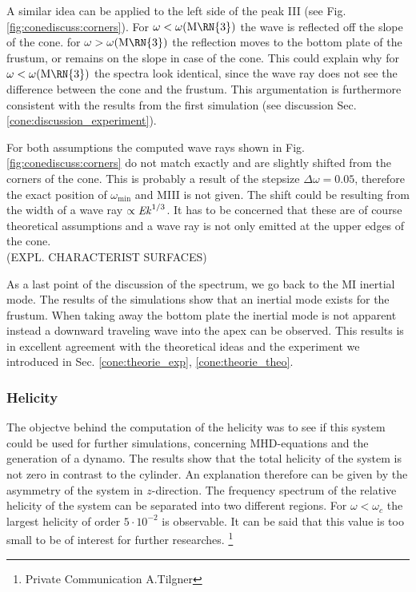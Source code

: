 A similar idea can be applied to the left side of the peak \RN{3} (see Fig. \ref{fig:conediscuss:corners}).
For $\omega<\omega(\text{M\RN{3}})$ the wave is reflected off the slope of the cone.
for  $\omega>\omega(\text{M\RN{3}})$ the reflection moves to the bottom plate of the frustum,
or remains on the slope in case of the cone.
This could explain why for   $\omega<\omega(\text{M\RN{3}})$  the spectra look identical,
since the wave ray does not see the difference between the cone and the frustum.
This argumentation is furthermore consistent with the results from the first simulation
(see discussion Sec. \ref{cone:discussion_experiment}).

For both assumptions the computed wave rays shown in Fig. \ref{fig:conediscuss:corners} do not match exactly and are slightly shifted from the corners of the cone.
This is probably a result of the stepsize $\Delta \omega = 0.05$, therefore the exact position of $\omega_\text{min}$ and M\RN{3} is not given.
The shift could be resulting from the width of a wave ray $\propto \mbox{\textit{Ek}}^{1/3}$.
It has to be concerned that these are of course theoretical assumptions and a wave ray is not only emitted at the
upper edges of the cone.\\ (EXPL. CHARACTERIST SURFACES)

As a last point of the discussion of the spectrum, we go back to the M\RN{1} inertial mode.
The results of the simulations show that an inertial mode exists for the frustum.
When taking away the bottom plate the inertial mode is not apparent instead
a downward traveling wave into the apex can be observed.
This results is in excellent agreement with the theoretical ideas and the experiment we introduced in Sec.
\ref{cone:theorie_exp}, \ref{cone:theorie_theo}.

\subsubsection{Helicity}

The objectve behind the computation of the helicity was to see if this system could be used
for further simulations, concerning MHD-equations and the generation of a dynamo.
The results show that the total helicity of the system is not zero in contrast to the cylinder.
An explanation therefore can be given by the asymmetry of the system in $z$-direction.
The frequency spectrum of the relative helicity of the  system can be separated into two different regions.
For $\omega<\omega_c$ the largest helicity of order $5\cdot10^{-2}$ is observable.
It can be said that this value is too small to be of interest for further researches.
\footnote{Private Communication A.Tilgner}



